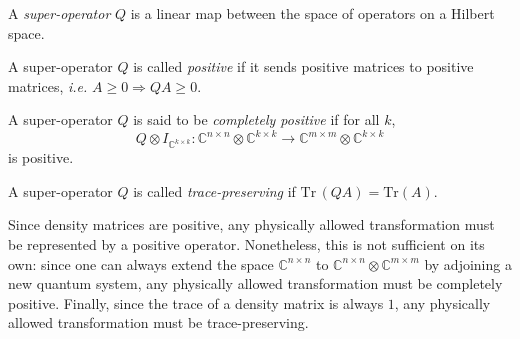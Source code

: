 
\begin{definition}
  A \emph{super-operator} $Q$ is a linear map between the space of operators on a Hilbert space. 
\end{definition}

\begin{definition} \label{def:positive_superoperator}
  A super-operator $Q$ is called \emph{positive} if it sends positive matrices to positive matrices, \textit{i.e.} $A \geq 0 \Rightarrow{} Q A \geq 0$.
\end{definition}

\begin{definition} \label{def:completely_positive_superoperator}
  A super-operator $Q$ is said to be \emph{completely positive} if for all $k$, 
  $$Q \otimes I_{\mathbb{C}^{k \times k}}: \mathbb{C}^{n \times n} \otimes \mathbb{C}^{k \times k} \rightarrow \mathbb{C}^{m \times m} \otimes \mathbb{C}^{k \times k}  $$
   is positive.
\end{definition}

\begin{definition} \label{def:trace_preserving_superoperator}
  A super-operator $Q$ is called \emph{trace-preserving} if $\text{Tr} \hspace{2pt} (Q A)= \text{Tr} (A)$.
\end{definition}

Since density matrices are positive, any physically allowed transformation must be represented by a positive operator. Nonetheless, this is not sufficient on its own: since one can always extend the space $\mathbb{C}^{n \times n}$ to  $\mathbb{C}^{n \times n} \otimes \mathbb{C}^{m \times m} $ by adjoining a new quantum system, any physically allowed transformation must be completely positive. Finally, since the trace of a density matrix is always $1$, any physically allowed transformation must be trace-preserving. 

